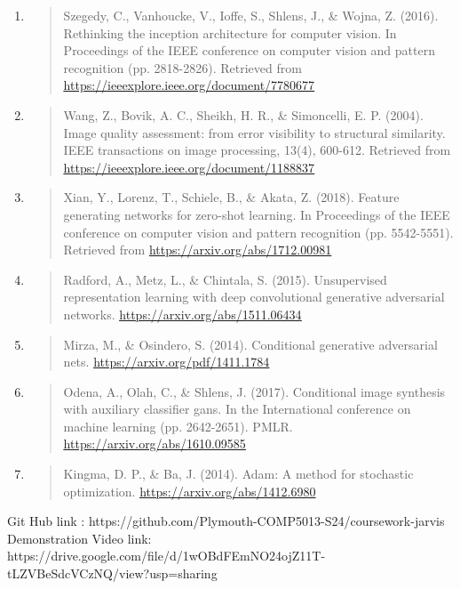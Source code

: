 \documentclass[
]{article}
\begin{document}
\begin{enumerate}
\item
  \begin{quote}
  Szegedy, C., Vanhoucke, V., Ioffe, S., Shlens, J., \& Wojna, Z.
  (2016). Rethinking the inception architecture for computer vision. In
  Proceedings of the IEEE conference on computer vision and pattern
  recognition (pp. 2818-2826). Retrieved from
  \href{https://ieeexplore.ieee.org/document/7780677}{\uline{https://ieeexplore.ieee.org/document/7780677}}
  \end{quote}

\item
  \begin{quote}
  Wang, Z., Bovik, A. C., Sheikh, H. R., \& Simoncelli, E. P. (2004).
  Image quality assessment: from error visibility to structural
  similarity. IEEE transactions on image processing, 13(4), 600-612.
  Retrieved from
  \href{https://ieeexplore.ieee.org/document/1188837}{\uline{https://ieeexplore.ieee.org/document/1188837}}
  \end{quote}

\item
  \begin{quote}
  Xian, Y., Lorenz, T., Schiele, B., \& Akata, Z. (2018). Feature
  generating networks for zero-shot learning. In Proceedings of the IEEE
  conference on computer vision and pattern recognition (pp. 5542-5551).
  Retrieved from
  \href{https://arxiv.org/abs/1712.00981}{\uline{https://arxiv.org/abs/1712.00981}}
  \end{quote}
\item
  \begin{quote}
  Radford, A., Metz, L., \& Chintala, S. (2015). Unsupervised
  representation learning with deep convolutional generative adversarial
  networks.
  \href{https://arxiv.org/abs/1511.06434}{\uline{https://arxiv.org/abs/1511.06434}}
  \end{quote}
\item
  \begin{quote}
  Mirza, M., \& Osindero, S. (2014). Conditional generative adversarial
  nets.
  \href{https://arxiv.org/pdf/1411.1784}{\uline{https://arxiv.org/pdf/1411.1784}}
  \end{quote}
\item
  \begin{quote}
  Odena, A., Olah, C., \& Shlens, J. (2017). Conditional image synthesis
  with auxiliary classifier gans. In the International conference on
  machine learning (pp. 2642-2651). PMLR.
  \href{https://arxiv.org/abs/1610.09585}{\uline{https://arxiv.org/abs/1610.09585}}
  \end{quote}
\item
  \begin{quote}
  Kingma, D. P., \& Ba, J. (2014). Adam: A method for stochastic
  optimization.
  \href{https://arxiv.org/abs/1412.6980}{\uline{https://arxiv.org/abs/1412.6980}}
  \end{quote}
\end{enumerate}
Git Hub link : https://github.com/Plymouth-COMP5013-S24/coursework-jarvis
Demonstration Video link: https://drive.google.com/file/d/1wOBdFEmNO24ojZ11T-tLZVBeSdcVCzNQ/view?usp=sharing
\end{document}
